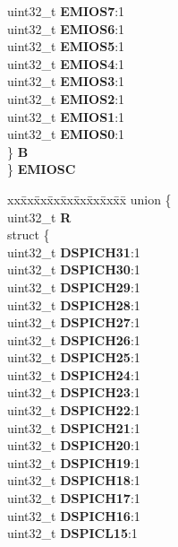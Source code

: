\begin{DoxyCompactItemize}
\begin{tabbing}
\>\>uint32\_t {\bfseries EMIOS7}:1\\
\>\>uint32\_t {\bfseries EMIOS6}:1\\
\>\>uint32\_t {\bfseries EMIOS5}:1\\
\>\>uint32\_t {\bfseries EMIOS4}:1\\
\>\>uint32\_t {\bfseries EMIOS3}:1\\
\>\>uint32\_t {\bfseries EMIOS2}:1\\
\>\>uint32\_t {\bfseries EMIOS1}:1\\
\>\>uint32\_t {\bfseries EMIOS0}:1\\
\>\} {\bfseries B}\\
\} {\bfseries EMIOSC}\\

\end{tabbing}\item 
\mbox{\label{structSIU__tag_a38feeff007408100ad26952717ce4486}} 
\begin{tabbing}
xx\=xx\=xx\=xx\=xx\=xx\=xx\=xx\=xx\=\kill
union \{\\
\>uint32\_t {\bfseries R}\\
\>struct \{\\
\>\>uint32\_t {\bfseries DSPICH31}:1\\
\>\>uint32\_t {\bfseries DSPICH30}:1\\
\>\>uint32\_t {\bfseries DSPICH29}:1\\
\>\>uint32\_t {\bfseries DSPICH28}:1\\
\>\>uint32\_t {\bfseries DSPICH27}:1\\
\>\>uint32\_t {\bfseries DSPICH26}:1\\
\>\>uint32\_t {\bfseries DSPICH25}:1\\
\>\>uint32\_t {\bfseries DSPICH24}:1\\
\>\>uint32\_t {\bfseries DSPICH23}:1\\
\>\>uint32\_t {\bfseries DSPICH22}:1\\
\>\>uint32\_t {\bfseries DSPICH21}:1\\
\>\>uint32\_t {\bfseries DSPICH20}:1\\
\>\>uint32\_t {\bfseries DSPICH19}:1\\
\>\>uint32\_t {\bfseries DSPICH18}:1\\
\>\>uint32\_t {\bfseries DSPICH17}:1\\
\>\>uint32\_t {\bfseries DSPICH16}:1\\
\>\>uint32\_t {\bfseries DSPICL15}:1\\

\end{tabbing}
\end{DoxyCompactItemize}
